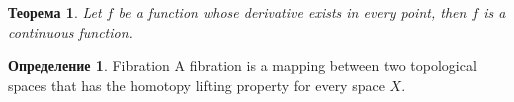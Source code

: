 \documentclass[12pt,a4paper,oneside]{article}
\newtheorem{theorem}{Теорема}
\theoremstyle{definition}
\newtheorem{definition}{Определение}[]
\theoremstyle{lemma}
\theoremstyle{remark}
\begin{document}
\begin{theorem}
Let $f$ be a function whose derivative exists in every point, then $f$
is a continuous function.
\end{theorem}

\begin{definition}{Fibration}
A fibration is a mapping between two topological spaces that has the homotopy lifting property for every space $X$.
\end{definition}


%
%
\newpage


\end{document}
